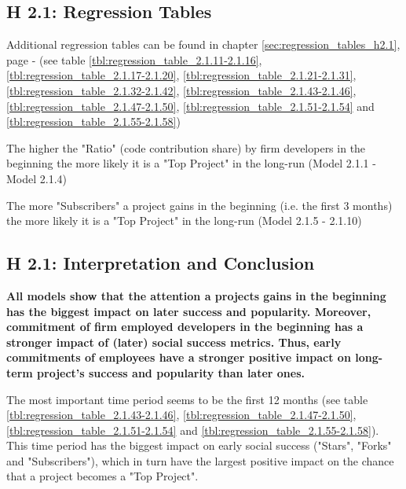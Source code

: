 \clearpage
\subsection{H 2.1: Regression Tables}

Additional regression tables can be found in chapter \ref{sec:regression_tables_h2.1}, page \pageref{tbl:regression_table_2.1.11-2.1.16} - \pageref{tbl:regression_table_2.1.55-2.1.58} (see table \ref{tbl:regression_table_2.1.11-2.1.16}, \ref{tbl:regression_table_2.1.17-2.1.20}, \ref{tbl:regression_table_2.1.21-2.1.31}, \ref{tbl:regression_table_2.1.32-2.1.42}, \ref{tbl:regression_table_2.1.43-2.1.46}, \ref{tbl:regression_table_2.1.47-2.1.50}, \ref{tbl:regression_table_2.1.51-2.1.54} and \ref{tbl:regression_table_2.1.55-2.1.58})


\begin{table}[!h] \centering
	\footnotesize
	
	\caption{The higher the "Ratio" (code contribution share) by firm developers in the beginning the more likely it is a "Top Project" in the long-run (Model 2.1.1 - Model 2.1.4)}
  \label{tbl:regression_table_2.1.1-2.1.4}
\end{table}
\begin{table}[!h] \centering
	\footnotesize
	
	\caption{The more "Subscribers" a project gains in the beginning (i.e. the first 3 months) the more likely it is a "Top Project" in the long-run (Model 2.1.5 - 2.1.10)}
  \label{tbl:regression_table_2.1.5-2.1.10}
\end{table}

\normalsize

\clearpage
\subsection{H 2.1: Interpretation and Conclusion}

\textbf{All models show that the attention a projects gains in the beginning has the biggest impact on later success and popularity. Moreover, commitment of firm employed developers in the beginning has a stronger impact of (later) social success metrics. Thus, early commitments of employees have a stronger positive impact on long-term project's success and popularity than later ones.}

The most important time period seems to be the first 12 months (see table \ref{tbl:regression_table_2.1.43-2.1.46}, \ref{tbl:regression_table_2.1.47-2.1.50}, \ref{tbl:regression_table_2.1.51-2.1.54} and \ref{tbl:regression_table_2.1.55-2.1.58}). This time period has the biggest impact on early social success ("Stars", "Forks" and "Subscribers"), which in turn have the largest positive impact on the chance that a project becomes a "Top Project".


